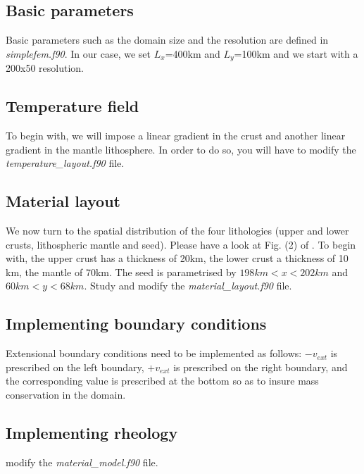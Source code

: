 \documentclass[a4paper]{article}
\begin{document}
\subsection{Basic parameters}

Basic parameters such as the domain size and the resolution are defined in {\sl simplefem.f90}.
In our case, we set $L_x$=400km and $L_y$=100km and we start with a 200x50 resolution. 

\subsection{Temperature field}

To begin with, we will impose a linear gradient in the crust and another linear gradient in the mantle lithosphere.
In order to do so, you will have to modify the {\sl temperature\_layout.f90} file. 

\subsection{Material layout}

We now turn to the spatial distribution of the four lithologies (upper and lower crusts, lithospheric mantle and seed). 
Please have a look at Fig. (2) of \cite{nabu15}. To begin with, the upper crust has a thickness of 20km, the lower crust a thickness of 10 km, the mantle of 70km. The seed is parametrised by $198km<x<202km$ and $60km<y<68km$.
Study and modify the {\sl material\_layout.f90} file.

\subsection{Implementing boundary conditions}

Extensional boundary conditions need to be implemented as follows: 
$-v_{ext}$ is prescribed on the left boundary,
$+v_{ext}$ is prescribed on the right boundary,
and the corresponding value is prescribed at the bottom so as to insure mass conservation in the domain.

\subsection{Implementing rheology}

modify the {\sl material\_model.f90} file.
\end{document}
